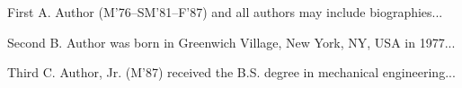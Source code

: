 \begin{IEEEbiography}{First A. Author}
(M'76--SM'81--F'87) and all authors may include biographies...
\end{IEEEbiography}

\begin{IEEEbiography}{Second B. Author}
was born in Greenwich Village, New York, NY, USA in 1977... 
\end{IEEEbiography}

\begin{IEEEbiography}{Third C. Author, Jr.}
(M'87) received the B.S. degree in mechanical engineering...
\end{IEEEbiography}
